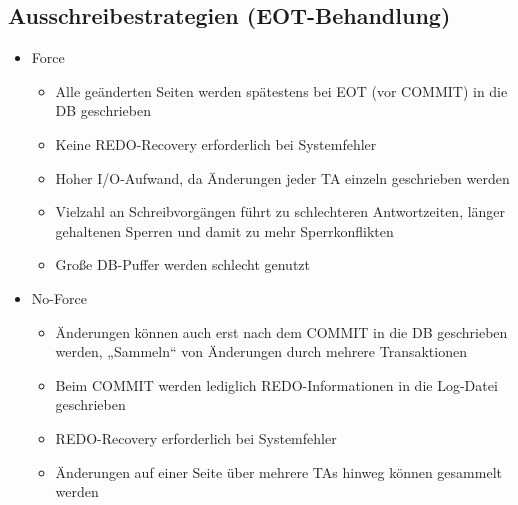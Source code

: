 \documentclass{lehramt-informatik}
\begin{document}
%

\subsection{Ausschreibestrategien (EOT-Behandlung)}

\begin{itemize}

\item Force

\begin{itemize}
\item Alle geänderten Seiten werden spätestens bei EOT (vor COMMIT) in
die DB geschrieben

\item Keine REDO-Recovery erforderlich bei Systemfehler

\item Hoher I/O-Aufwand, da Änderungen jeder TA einzeln geschrieben
werden

\item Vielzahl an Schreibvorgängen führt zu schlechteren Antwortzeiten,
länger gehaltenen Sperren und damit zu mehr Sperrkonflikten

\item Große DB-Puffer werden schlecht genutzt
\end{itemize}

\item No-Force

\begin{itemize}
\item Änderungen können auch erst nach dem COMMIT in die DB geschrieben
werden, „Sammeln“ von Änderungen durch mehrere Transaktionen

\item Beim COMMIT werden lediglich REDO-Informationen in die Log-Datei
geschrieben

\item REDO-Recovery erforderlich bei Systemfehler

\item Änderungen auf einer Seite über mehrere TAs hinweg können
gesammelt werden
\end{itemize}
\end{itemize}

\literatur
\end{document}
